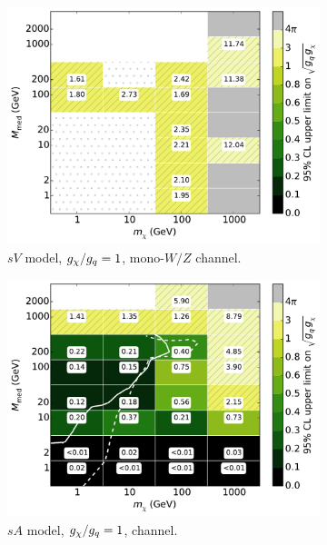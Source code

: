 \begin{figure}
\begin{subfigure}[t]{0.32\textwidth}
    \centering
    \includegraphics[width=1.\textwidth]{figures/grid_basepoints_SVD_rat1_monoWZ.pdf}
    \caption{$sV$ model, $g_{\chi}/g_q = 1$, mono-$W/Z$ channel.}
    \vspace{0.75cm}
  \end{subfigure}
  \begin{subfigure}[t]{0.32\textwidth}
    \centering
    \includegraphics[width=1.\textwidth]{figures/grid_basepoints_SAD_rat1_monojet.pdf}
    \caption{$sA$ model, $g_{\chi}/g_q = 1$, \monojet channel.}
  \end{subfigure}
  \begin{subfigure}[t]{0.32\textwidth}
    \centering

\end{subfigure}
\end{figure}
